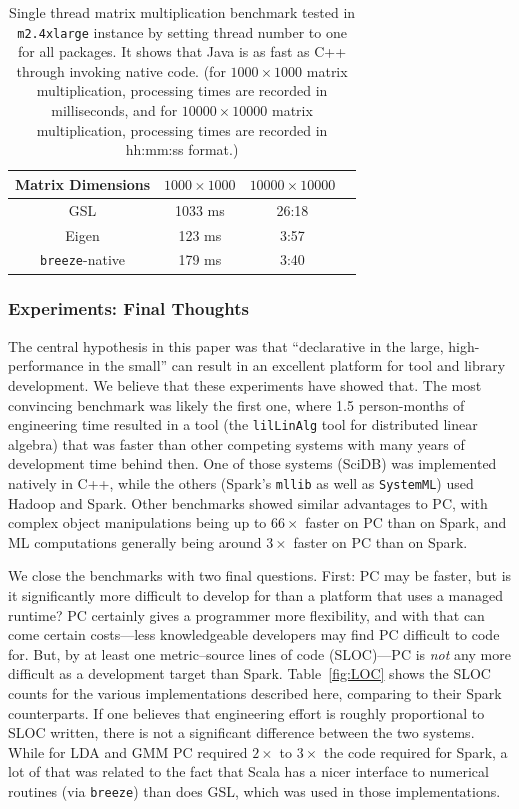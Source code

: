 \begin{table}[t]
\begin{center}
\begin{tabular}{|c||c|c|c|}
\hline
Matrix Dimensions & $1000\times1000$ & $10000\times10000$ \\
\hline
\hline
GSL &1033 ms &26:18  \\
Eigen &123 ms  &3:57\\
\texttt{breeze}-native &179 ms  &3:40\\
\hline
\end{tabular}
\caption{Single thread matrix multiplication benchmark tested in
  \texttt{m2.4xlarge} instance by setting thread number  to one for all
  packages. It shows that
  Java is as fast as C++ through invoking native code. (for
  $1000\times1000$ matrix multiplication, processing times are recorded in
  milliseconds, and for $10000\times10000$ matrix multiplication, processing times are
  recorded in hh:mm:ss format.)}
\label{fig:matrixMult}
\end{center}
\end{table}


\subsubsection{Experiments: Final Thoughts}

The central hypothesis in this paper was that ``declarative in the large, high-performance in the small'' can result
in an excellent platform for tool and library development.  We believe that these experiments have showed that.  The
most convincing benchmark was likely the first one, where 1.5 person-months of engineering time resulted in a tool
(the \texttt{lilLinAlg} tool for distributed linear algebra) that 
was faster than other competing systems with many years of development time behind then.  One of those systems (SciDB)
was implemented natively in C++, while the others (Spark's \texttt{mllib} as well as \texttt{SystemML}) used Hadoop and Spark.  
Other benchmarks showed similar advantages to PC, with complex object manipulations being 
up to $66 \times$ faster on PC than on Spark, and ML computations generally being around $3 \times$ faster on PC than on Spark.

We close the benchmarks with two final questions.  First: PC may be faster, but is it significantly more difficult to develop
for than a platform that uses a managed runtime?  PC certainly gives a programmer more flexibility, and with that can come
certain costs---less knowledgeable developers may find PC difficult to code for.  But, by at least one metric--source
lines of code (SLOC)---PC is \emph{not}
any more difficult as a development target than Spark.
Table~\ref{fig:LOC} shows the SLOC counts for the various implementations described here, comparing to their Spark counterparts.
If one believes that engineering effort is roughly proportional to SLOC written, there is not a significant
difference between the two
systems.  
While for LDA and GMM PC required $2\times$ to $3\times$ the code required for Spark, a lot of that was related
to the fact that Scala has a nicer interface to numerical routines (via \texttt{breeze}) 
than does GSL, which was used in those
implementations.

